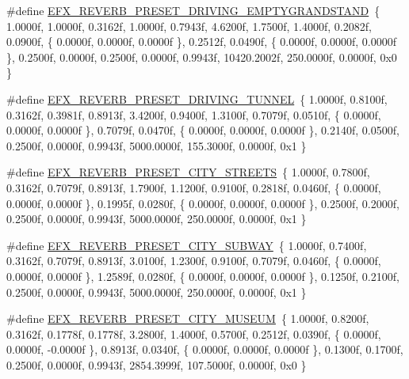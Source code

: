 \begin{DoxyCompactItemize}
\item 
\#define \hyperlink{efx-presets_8h_abf3d74db7c07cfbe62e57ac41933fe16}{E\+F\+X\+\_\+\+R\+E\+V\+E\+R\+B\+\_\+\+P\+R\+E\+S\+E\+T\+\_\+\+D\+R\+I\+V\+I\+N\+G\+\_\+\+E\+M\+P\+T\+Y\+G\+R\+A\+N\+D\+S\+T\+A\+ND}~\{ 1.\+0000f, 1.\+0000f, 0.\+3162f, 1.\+0000f, 0.\+7943f, 4.\+6200f, 1.\+7500f, 1.\+4000f, 0.\+2082f, 0.\+0900f, \{ 0.\+0000f, 0.\+0000f, 0.\+0000f \}, 0.\+2512f, 0.\+0490f, \{ 0.\+0000f, 0.\+0000f, 0.\+0000f \}, 0.\+2500f, 0.\+0000f, 0.\+2500f, 0.\+0000f, 0.\+9943f, 10420.\+2002f, 250.\+0000f, 0.\+0000f, 0x0 \}
\item 
\#define \hyperlink{efx-presets_8h_abdc865e490c2ea43f97a7c2db574f917}{E\+F\+X\+\_\+\+R\+E\+V\+E\+R\+B\+\_\+\+P\+R\+E\+S\+E\+T\+\_\+\+D\+R\+I\+V\+I\+N\+G\+\_\+\+T\+U\+N\+N\+EL}~\{ 1.\+0000f, 0.\+8100f, 0.\+3162f, 0.\+3981f, 0.\+8913f, 3.\+4200f, 0.\+9400f, 1.\+3100f, 0.\+7079f, 0.\+0510f, \{ 0.\+0000f, 0.\+0000f, 0.\+0000f \}, 0.\+7079f, 0.\+0470f, \{ 0.\+0000f, 0.\+0000f, 0.\+0000f \}, 0.\+2140f, 0.\+0500f, 0.\+2500f, 0.\+0000f, 0.\+9943f, 5000.\+0000f, 155.\+3000f, 0.\+0000f, 0x1 \}
\item 
\#define \hyperlink{efx-presets_8h_ad152b664c7db3b0dd8ab1757bed252af}{E\+F\+X\+\_\+\+R\+E\+V\+E\+R\+B\+\_\+\+P\+R\+E\+S\+E\+T\+\_\+\+C\+I\+T\+Y\+\_\+\+S\+T\+R\+E\+E\+TS}~\{ 1.\+0000f, 0.\+7800f, 0.\+3162f, 0.\+7079f, 0.\+8913f, 1.\+7900f, 1.\+1200f, 0.\+9100f, 0.\+2818f, 0.\+0460f, \{ 0.\+0000f, 0.\+0000f, 0.\+0000f \}, 0.\+1995f, 0.\+0280f, \{ 0.\+0000f, 0.\+0000f, 0.\+0000f \}, 0.\+2500f, 0.\+2000f, 0.\+2500f, 0.\+0000f, 0.\+9943f, 5000.\+0000f, 250.\+0000f, 0.\+0000f, 0x1 \}
\item 
\#define \hyperlink{efx-presets_8h_ad8fff58ad71c8bdac17504c3f8417ed1}{E\+F\+X\+\_\+\+R\+E\+V\+E\+R\+B\+\_\+\+P\+R\+E\+S\+E\+T\+\_\+\+C\+I\+T\+Y\+\_\+\+S\+U\+B\+W\+AY}~\{ 1.\+0000f, 0.\+7400f, 0.\+3162f, 0.\+7079f, 0.\+8913f, 3.\+0100f, 1.\+2300f, 0.\+9100f, 0.\+7079f, 0.\+0460f, \{ 0.\+0000f, 0.\+0000f, 0.\+0000f \}, 1.\+2589f, 0.\+0280f, \{ 0.\+0000f, 0.\+0000f, 0.\+0000f \}, 0.\+1250f, 0.\+2100f, 0.\+2500f, 0.\+0000f, 0.\+9943f, 5000.\+0000f, 250.\+0000f, 0.\+0000f, 0x1 \}
\item 
\#define \hyperlink{efx-presets_8h_a9c70e815312e934808217c272af2c5d7}{E\+F\+X\+\_\+\+R\+E\+V\+E\+R\+B\+\_\+\+P\+R\+E\+S\+E\+T\+\_\+\+C\+I\+T\+Y\+\_\+\+M\+U\+S\+E\+UM}~\{ 1.\+0000f, 0.\+8200f, 0.\+3162f, 0.\+1778f, 0.\+1778f, 3.\+2800f, 1.\+4000f, 0.\+5700f, 0.\+2512f, 0.\+0390f, \{ 0.\+0000f, 0.\+0000f, -\/0.\+0000f \}, 0.\+8913f, 0.\+0340f, \{ 0.\+0000f, 0.\+0000f, 0.\+0000f \}, 0.\+1300f, 0.\+1700f, 0.\+2500f, 0.\+0000f, 0.\+9943f, 2854.\+3999f, 107.\+5000f, 0.\+0000f, 0x0 \}

\end{DoxyCompactItemize}
